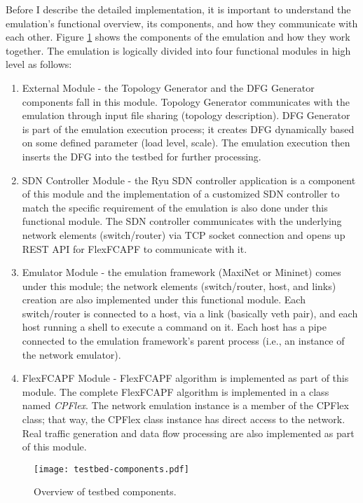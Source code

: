 Before I describe the detailed implementation, it is important to understand the emulation's functional overview, its components, and how they communicate with each other. Figure \ref{fig:testcomp} shows the components of the emulation and how they work together. The emulation is logically divided into four functional modules in high level as follows:
\begin{enumerate}
\item External Module - the Topology Generator and the DFG Generator components fall in this module. Topology Generator communicates with the emulation through input file sharing (topology description). DFG Generator is part of the emulation execution process; it creates DFG dynamically based on some defined parameter (load level, scale). The emulation execution then inserts the DFG into the testbed for further processing.
\item SDN Controller Module - the Ryu SDN controller application is a component of this module and the implementation of a customized SDN controller to match the specific requirement of the emulation is also done under this functional module. The SDN controller communicates with the underlying network elements (switch/router) via TCP socket connection and opens up REST API for FlexFCAPF to communicate with it.
\item Emulator Module - the emulation framework (MaxiNet or Mininet) comes under this module; the network elements (switch/router, host, and links) creation are also implemented under this functional module. Each switch/router is connected to a host, via a link (basically veth pair), and each host running a shell to execute a command on it. Each host has a pipe connected to the emulation framework's parent process (i.e., an instance of the network emulator).
\item FlexFCAPF Module - FlexFCAPF algorithm is implemented as part of this module. The complete FlexFCAPF algorithm is implemented in a class named \textit{CPFlex}. The network emulation instance is a member of the CPFlex class; that way, the CPFlex class instance has direct access to the network. Real traffic generation and data flow processing are also implemented as part of this module.
\end{enumerate}

\begin{figure}[H]
	\begin{center}
		\resizebox{\textwidth}{!}
		{\texttt{[image: testbed-components.pdf]}}
		\caption{Overview of testbed components.}
		\label{fig:testcomp}
	\end{center}
\end{figure}

